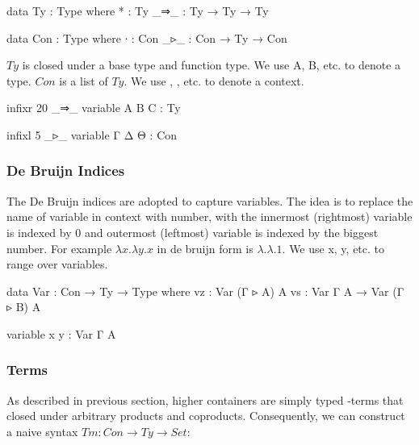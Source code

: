 \begin{code}
data Ty : Type where
  * : Ty
  _⇒_ : Ty → Ty → Ty

data Con : Type where
  ∙   : Con
  _▹_ : Con → Ty → Con
\end{code}

$Ty$ is closed under a base type and function type. We use A, B, etc. to denote a type. $Con$ is a list of $Ty$. We use \Gamma, \Delta, etc. to denote a context.

\begin{code}[hide]
infixr 20 _⇒_
variable A B C : Ty

infixl 5 _▹_
variable Γ Δ Θ : Con
\end{code}

\subsubsection*{De Bruijn Indices}

The De Bruijn indices are adopted to capture variables. The idea is to replace the name of variable in context with number, with the innermost (rightmost) variable is indexed by 0 and outermost (leftmost) variable is indexed by the biggest number. For example $\lambda x.\lambda y.x$ in de bruijn form is $\lambda.\lambda.1$. We use x, y, etc. to range over variables.

\begin{code}
data Var : Con → Ty → Type where
  vz : Var (Γ ▹ A) A
  vs : Var Γ A → Var (Γ ▹ B) A
\end{code}

\begin{code}[hide]
variable x y : Var Γ A
\end{code}

\subsubsection*{Terms}

As described in previous section, higher containers are simply typed \lambda-terms that closed under arbitrary products and coproducts. Consequently, we can construct a naive syntax $Tm : Con \to Ty \to Set$:



